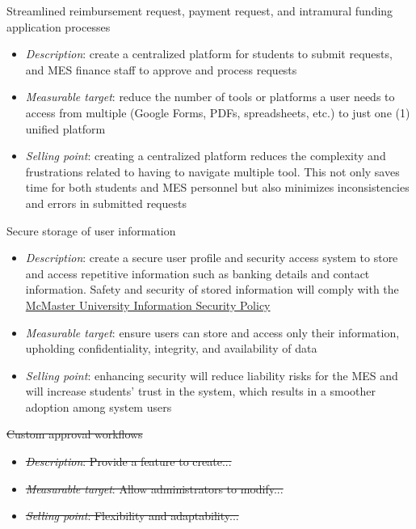 \documentclass{article}
\begin{document}
\begin{itemize}
    \item Streamlined reimbursement request, payment request, and intramural funding application processes
    \begin{itemize}
        \item \emph{Description}: create a centralized platform for students to submit requests, and MES finance staff to approve and process requests
        \item \emph{Measurable target}: reduce the number of tools or platforms a user needs to access from multiple (Google Forms, PDFs, spreadsheets, etc.) to just one (1) unified platform
        \item \emph{Selling point}: creating a centralized platform reduces the complexity and frustrations related to having to navigate multiple tool. This not only saves time for both students and MES personnel but also minimizes inconsistencies and errors in submitted requests
    \end{itemize}
    \item Secure storage of user information
    \begin{itemize}
        \item \emph{Description}: create a secure user profile and security access system to store and access repetitive information such as banking details and contact information. Safety and security of stored information will comply with the \href{https://informationsecurity.mcmaster.ca/policy/information-security-policy/}{McMaster University Information Security Policy}
        \item \emph{Measurable target}: ensure users can store and access only their information, upholding confidentiality, integrity, and availability of data
        \item \emph{Selling point}: enhancing security will reduce liability risks for the MES and will increase students' trust in the system, which results in a smoother adoption among system users
    \end{itemize}


    {\color{red}%
        \item \sout{Custom approval workflows} %
        \begin{itemize}
            \item \sout{\emph{Description}: Provide a feature to create...}
            \item \sout{\emph{Measurable target}: Allow administrators to modify...}
            \item \sout{\emph{Selling point}: Flexibility and adaptability...}
        \end{itemize}%
    }


\end{itemize}
\end{document}
